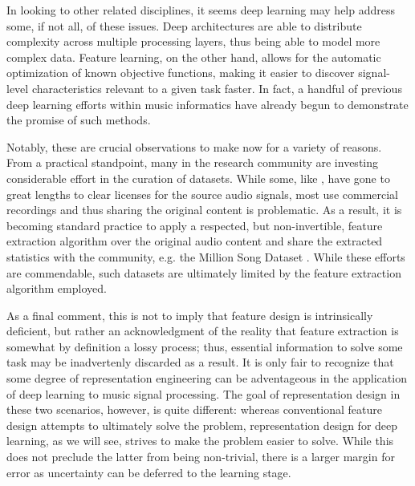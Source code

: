In looking to other related disciplines, it seems deep learning may help address some, if not all, of these issues.
Deep architectures are able to distribute complexity across multiple processing layers, thus being able to model more complex data.
Feature learning, on the other hand, allows for the automatic optimization of known objective functions, making it easier to discover signal-level characteristics relevant to a given task faster.
In fact, a handful of previous deep learning efforts within music informatics have already begun to demonstrate the promise of such methods.

Notably, these are crucial observations to make now for a variety of reasons.
From a practical standpoint, many in the research community are investing considerable effort in the curation of datasets.
While some, like \cite{Bittner2014Medleydb}, have gone to great lengths to clear licenses for the source audio signals, most use commercial recordings and thus sharing the original content is problematic.
As a result, it is becoming standard practice to apply a respected, but non-invertible, feature extraction algorithm over the original audio content and share the extracted statistics with the community, e.g. the Million Song Dataset \cite{Bertin2011Million}.
While these efforts are commendable, such datasets are ultimately limited by the feature extraction algorithm employed.

As a final comment, this is not to imply that feature design is intrinsically deficient, but rather an acknowledgment of the reality that feature extraction is somewhat by definition a lossy process;
thus, essential information to solve some task may be inadvertenly discarded as a result.
It is only fair to recognize that some degree of representation engineering can be adventageous in the application of deep learning to music signal processing.
The goal of representation design in these two scenarios, however, is quite different:
whereas conventional feature design attempts to ultimately solve the problem, representation design for deep learning, as we will see, strives to make the problem easier to solve.
While this does not preclude the latter from being non-trivial, there is a larger margin for error as uncertainty can be deferred to the learning stage.
